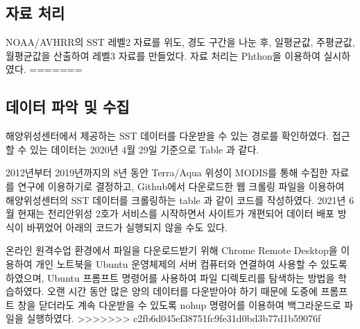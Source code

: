 \newpage
\subsection{자료 처리}

NOAA/AVHRR의 SST 레벨2 자료를 위도, 경도 구간을 나눈 후, 일평균값, 주평균값, 월평균값을 산출하여 레벨3 자료를 만들었다. 자료 처리는 Phthon을 이용하여 실시하였다. 
=======
\subsection{데이터 파악 및 수집}

해양위성센터에서 제공하는 SST 데이터를 다운받을 수 있는 경로를 확인하였다. 접근할 수 있는 데이터는 2020년 4월 29일 기준으로 Table 과 같다.

2012년부터 2019년까지의 8년 동안 Terra/Aqua 위성이 MODIS를 통해 수집한 자료를 연구에 이용하기로 결정하고, Github에서 다운로드한 웹 크롤링 파일을 이용하여 해양위성센터의 SST 데이터를 크롤링하는 table 과 같이 코드를 작성하였다. 2021년 6월 현재는 천리안위성 2호가 서비스를 시작하면서 사이트가 개편되어 데이터 배포 방식이 바뀌었어 아래의 코드가 실행되지 않을 수도 있다.

온라인 원격수업 환경에서 파일을 다운로드받기 위해 Chrome Remote Desktop을 이용하여 개인 노트북을 Ubuntu 운영체제의 서버 컴퓨터와 연결하여 사용할 수 있도록 하였으며, Ubuntu 프롬프트 명령어를 사용하여 파일 디렉토리를 탐색하는 방법을 학습하였다. 오랜 시간 동안 많은 양의 데이터를 다운받아야 하기 때문에 도중에 프롬프트 창을 닫더라도 계속 다운받을 수 있도록 nohup 명령어를 이용하여 백그라운드로 파일을 실행하였다. 
>>>>>>> c2fb6d045ef38751fc9fe31d0bd3b77d1b59076f

